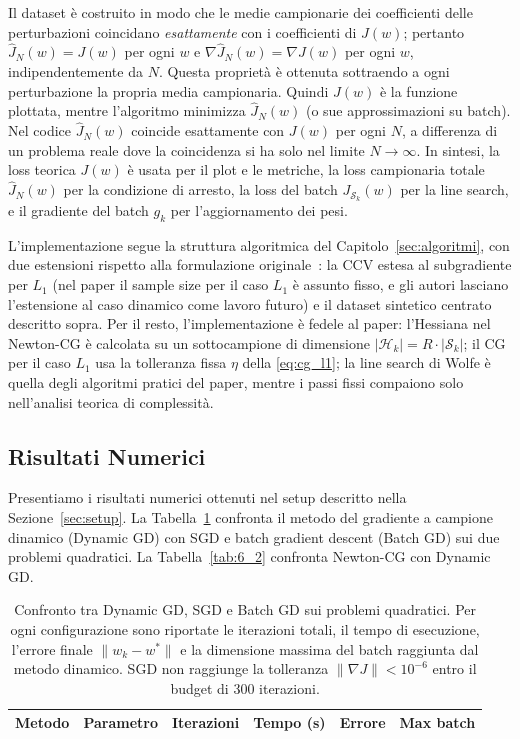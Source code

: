 Il dataset è costruito in modo che le medie campionarie dei coefficienti
delle perturbazioni coincidano \emph{esattamente} con i coefficienti di
$J(w)$; pertanto $\hat J_N(w) = J(w)$ per ogni $w$ e
$\nabla \hat J_N(w) = \nabla J(w)$ per ogni $w$, indipendentemente da $N$.
Questa proprietà è ottenuta sottraendo a ogni perturbazione la propria media
campionaria. Quindi $J(w)$ è la funzione plottata, mentre l'algoritmo
minimizza $\hat J_N(w)$ (o sue approssimazioni su batch). Nel codice
$\hat J_N(w)$ coincide esattamente con $J(w)$ per ogni $N$, a differenza di
un problema reale dove la coincidenza si ha solo nel limite $N \to \infty$.
In sintesi, la loss teorica $J(w)$ è usata per il plot e le metriche, la loss
campionaria totale $\hat J_N(w)$ per la condizione di arresto, la loss del
batch $J_{\mathcal{S}_k}(w)$ per la line search, e il gradiente del batch
$g_k$ per l'aggiornamento dei pesi.

L'implementazione segue la struttura algoritmica del
Capitolo~\ref{sec:algoritmi}, con due estensioni rispetto alla formulazione
originale~\cite{byrd2012}: la CCV estesa al subgradiente per $L_1$ (nel
paper il sample size per il caso $L_1$ è assunto fisso, e gli autori
lasciano l'estensione al caso dinamico come lavoro futuro) e il dataset
sintetico centrato descritto sopra. Per il resto, l'implementazione è fedele
al paper: l'Hessiana nel Newton-CG è calcolata su un sottocampione di
dimensione $|\mathcal{H}_k| = R \cdot |\mathcal{S}_k|$; il CG per il caso
$L_1$ usa la tolleranza fissa $\eta$ della \eqref{eq:cg_l1}; la line search
di Wolfe è quella degli algoritmi pratici del paper, mentre i passi fissi
compaiono solo nell'analisi teorica di complessità.

\subsection{Risultati Numerici}\label{sec:risultati}

Presentiamo i risultati numerici ottenuti nel setup descritto nella
Sezione~\ref{sec:setup}. La Tabella~\ref{tab:6_1} confronta il metodo del
gradiente a campione dinamico (Dynamic GD) con SGD e batch gradient descent
(Batch GD) sui due problemi quadratici. La Tabella~\ref{tab:6_2} confronta
Newton-CG con Dynamic GD.

\begin{table}[h]
\centering
\small
\renewcommand{\arraystretch}{1.3}
\begin{tabular}{l l r r r r}
\toprule
\textbf{Metodo} & \textbf{Parametro} & \textbf{Iterazioni} &
\textbf{Tempo (s)} & \textbf{Errore} & \textbf{Max batch} \\
\midrule

\bottomrule
\end{tabular}
\caption{Confronto tra Dynamic GD, SGD e Batch GD sui problemi quadratici.
Per ogni configurazione sono riportate le iterazioni totali, il tempo di
esecuzione, l'errore finale $\|w_k - w^*\|$ e la dimensione massima del batch
raggiunta dal metodo dinamico. SGD non raggiunge la tolleranza
$\|\nabla J\| < 10^{-6}$ entro il budget di 300 iterazioni.}
\label{tab:6_1}
\end{table}

